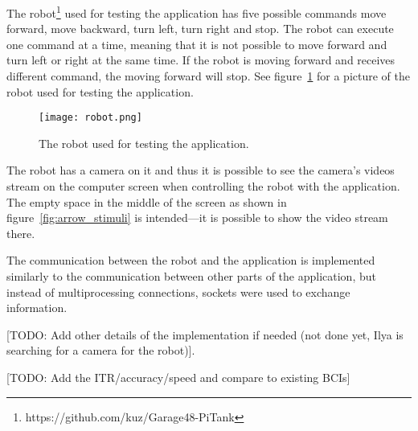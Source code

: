 The robot\footnote{https://github.com/kuz/Garage48-PiTank} used for testing the application has five possible commands move forward, move backward, turn left, turn right and stop. The robot can execute one command at a time, meaning that it is not possible to move forward and turn left or right at the same time. If the robot is moving forward and receives different command, the moving forward will stop. See figure~\ref{fig:robot} for a picture of the robot used for testing the application.

\begin{figure}[h]
	\centering
	\texttt{[image: robot.png]}
	\caption{The robot used for testing the application\protect\footnotemark.}
	\label{fig:robot}
\end{figure}
The robot has a camera on it and thus it is possible to see the camera's videos stream on the computer screen when controlling the robot with the application. The empty space in the middle of the screen as shown in figure~\ref{fig:arrow_stimuli} is intended---it is possible to show the video stream there.

The communication between the robot and the application is implemented similarly to the communication between other parts of the application, but instead of multiprocessing connections, sockets were used to exchange information.

[TODO: Add other details of the implementation if needed (not done yet, Ilya is searching for a camera for the robot)].

[TODO: Add the ITR/accuracy/speed and compare to existing BCIs]
